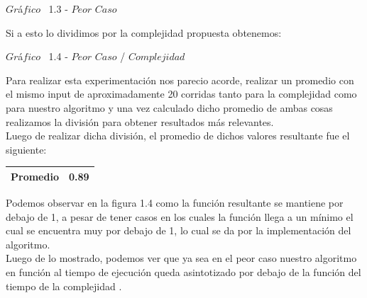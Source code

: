 \vspace*{0.3cm} \vspace*{0.3cm}
  \begin{center}
{$Gr$\'a$fico$ \ 1.3 - $Peor$ $Caso$}
  \end{center}
  \vspace*{0.3cm}

Si a esto lo dividimos por la complejidad propuesta obtenemos:\\

\vspace*{0.3cm} \vspace*{0.3cm}
  \begin{center}
 {$Gr$\'a$fico$ \ 1.4 - $Peor$ $Caso$ / $Complejidad$}
  \end{center}
   \vspace*{0.3cm}
  
  Para realizar esta experimentaci\'on nos parecio acorde, realizar un promedio con el mismo input de aproximadamente 20 corridas tanto para la complejidad como para nuestro algoritmo y una vez calculado dicho promedio de ambas cosas realizamos la divisi\'on para obtener resultados m\'as relevantes.\\ 

Luego de realizar dicha divisi\'on, el promedio de dichos valores resultante fue el siguiente:

\begin{center}
\begin{table}[H]
    \begin{tabular}{ | l |l |}
    \hline
	
    \textbf{Promedio} &  0.89 \\ \hline

    \end{tabular}
\end{table}
\end{center}

Podemos observar en la figura 1.4 como la funci\'on resultante se mantiene por debajo de 1, a pesar de tener casos en los cuales la funci\'on llega a un m\'inimo el cual se encuentra muy por debajo de 1, lo cual se da por la implementaci\'on del algoritmo.\\

Luego de lo mostrado, podemos ver que ya sea en el peor caso nuestro algoritmo en funci\'on al tiempo de ejecuci\'on queda asintotizado por debajo de la funci\'on del tiempo de la complejidad .